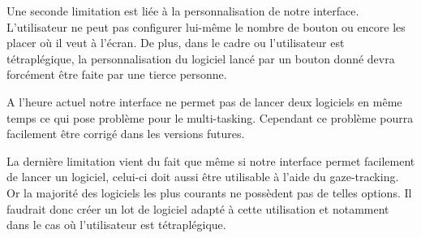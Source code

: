 Une seconde limitation est liée à la personnalisation de notre interface. L’utilisateur ne peut pas configurer lui-même le nombre de bouton ou encore les placer où il veut à l’écran. De plus, dans le cadre ou l’utilisateur est tétraplégique, la personnalisation du logiciel lancé par un bouton donné devra forcément être faite par une tierce personne.

A l’heure actuel notre interface ne permet pas de lancer deux logiciels en même temps ce qui pose problème pour le multi-tasking. Cependant ce problème pourra facilement être corrigé dans les versions futures.

La dernière limitation vient du fait que même si notre interface permet facilement de lancer un logiciel, celui-ci doit aussi être utilisable à l’aide du gaze-tracking. Or la majorité des logiciels les plus courants ne possèdent pas de telles options. Il faudrait donc créer un lot de logiciel adapté à cette utilisation et notamment dans le cas où l’utilisateur est tétraplégique.